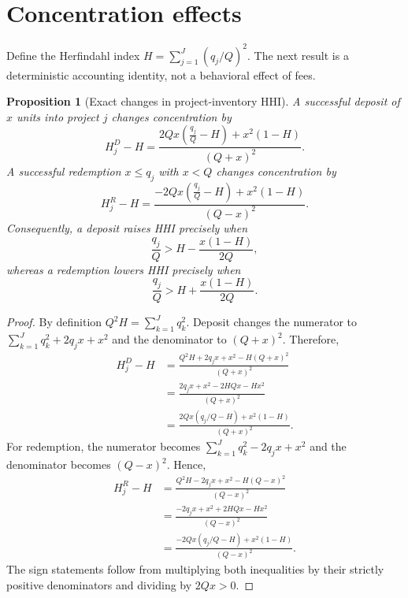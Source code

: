 \documentclass[11pt]{article}
\newtheorem{proposition}{Proposition}
\begin{document}
\section{Concentration effects}
Define the Herfindahl index $H=\sum_{j=1}^J (q_j/Q)^2$. The next result is a deterministic accounting identity, not a behavioral effect of fees.
\begin{proposition}[Exact changes in project-inventory HHI]
\label{prop:hhi}
A successful deposit of $x$ units into project $j$ changes concentration by
\begin{equation}
H^{D}_j-H=
\frac{2Qx\left(\frac{q_j}{Q}-H\right)+x^2(1-H)}{(Q+x)^2}.
\end{equation}
A successful redemption $x\le q_j$ with $x<Q$ changes concentration by
\begin{equation}
H^{R}_j-H=
\frac{-2Qx\left(\frac{q_j}{Q}-H\right)+x^2(1-H)}{(Q-x)^2}.
\end{equation}
Consequently, a deposit raises HHI precisely when
\begin{equation}
\frac{q_j}{Q}>H-\frac{x(1-H)}{2Q},
\end{equation}
whereas a redemption lowers HHI precisely when
\begin{equation}
\frac{q_j}{Q}>H+\frac{x(1-H)}{2Q}.
\end{equation}
\end{proposition}
\begin{proof}
By definition $Q^2H=\sum_{k=1}^Jq_k^2$. Deposit changes the numerator to $\sum_{k=1}^Jq_k^2+2q_jx+x^2$ and the denominator to $(Q+x)^2$. Therefore,
\[
\begin{aligned}
H_j^D-H
&=\frac{Q^2H+2q_jx+x^2-H(Q+x)^2}{(Q+x)^2}\\
&=\frac{2q_jx+x^2-2HQx-Hx^2}{(Q+x)^2}\\
&=\frac{2Qx(q_j/Q-H)+x^2(1-H)}{(Q+x)^2}.
\end{aligned}
\]
For redemption, the numerator becomes $\sum_{k=1}^Jq_k^2-2q_jx+x^2$ and the denominator becomes $(Q-x)^2$. Hence,
\[
\begin{aligned}
H_j^R-H
&=\frac{Q^2H-2q_jx+x^2-H(Q-x)^2}{(Q-x)^2}\\
&=\frac{-2q_jx+x^2+2HQx-Hx^2}{(Q-x)^2}\\
&=\frac{-2Qx(q_j/Q-H)+x^2(1-H)}{(Q-x)^2}.
\end{aligned}
\]
The sign statements follow from multiplying both inequalities by their strictly positive denominators and dividing by $2Qx>0$.
\end{proof}
\end{document}
